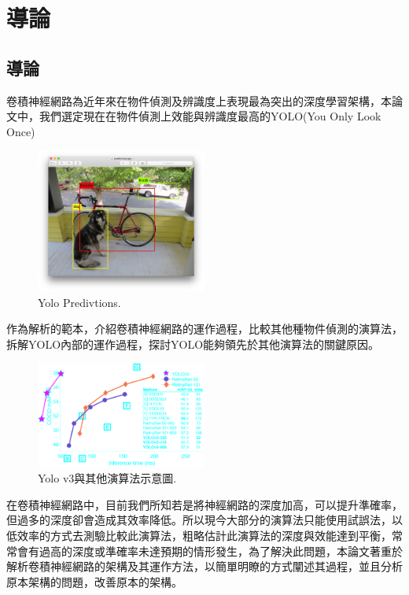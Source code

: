 \chapter{導論}
\label{c:1}

\section{導論}
卷積神經網路為近年來在物件偵測及辨識度上表現最為突出的深度學習架構，本論文中，我們選定現在在物件偵測上效能與辨識度最高的YOLO(You Only Look Once)\\
\begin{figure}[htpb!]
  \centering
    \includegraphics[width=0.5\textwidth]{fig/yolopredictions.png}
    \caption{\label{fig:yolov3}Yolo Predivtions.}
\end{figure}作為解析的範本，介紹卷積神經網路的運作過程，比較其他種物件偵測的演算法，拆解YOLO內部的運作過程，探討YOLO能夠領先於其他演算法的關鍵原因。\\
\begin{figure}[htpb!]
  \centering
    \includegraphics[width=0.5\textwidth]{fig/map50blue.png}
    \caption{\label{fig:yolov3}Yolo v3與其他演算法示意圖.}
\end{figure}
在卷積神經網路中，目前我們所知若是將神經網路的深度加高，可以提升準確率，但過多的深度卻會造成其效率降低。所以現今大部分的演算法只能使用試誤法，以低效率的方式去測驗比較此演算法，粗略估計此演算法的深度與效能達到平衡，常常會有過高的深度或準確率未達預期的情形發生，為了解決此問題，本論文著重於解析卷積神經網路的架構及其運作方法，以簡單明瞭的方式闡述其過程，並且分析原本架構的問題，改善原本的架構。\\
